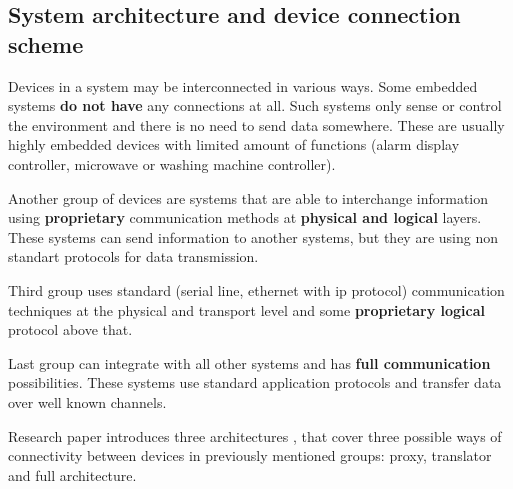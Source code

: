 \subsection{System architecture and  device connection scheme}
\label{sec:device_connection_scheme}
Devices in a system may be interconnected in various ways.
Some embedded systems \textbf{do not have} any connections at all. 
Such systems only sense or control the environment and there is no need to
send data somewhere. These are usually highly embedded devices with limited
amount of functions (alarm display controller, microwave or washing machine
controller).

Another group of devices are systems that are able to interchange
information using \textbf{proprietary} communication methods at \textbf{physical
and logical} layers. These systems can send information to another systems, but
they are using non standart protocols for data transmission.

Third group uses standard (serial line, ethernet with ip protocol)
communication techniques at the physical and transport level and some \textbf{proprietary
logical} protocol above that.

Last group can integrate with all other systems and has \textbf{full
communication} possibilities. These systems use standard application protocols
and transfer data over well known channels.

Research paper \cite{lws_milanovic.pdf} introduces three architectures , that
cover three possible ways of connectivity between devices in previously 
mentioned groups: proxy, translator and full architecture.

